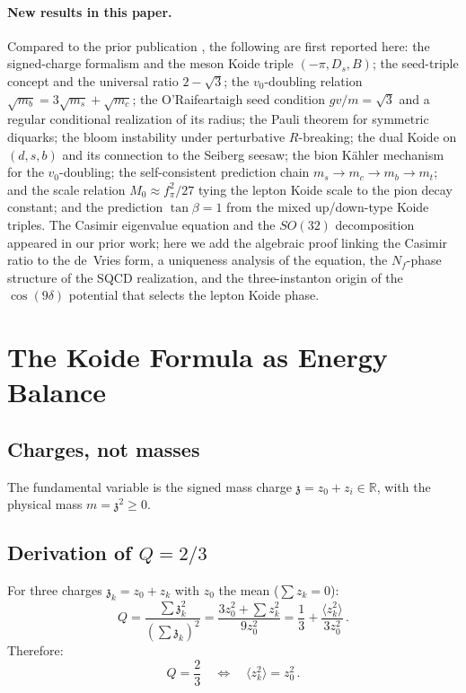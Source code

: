 \documentclass[12pt,a4paper]{article}
\newcommand{\fpi}{f_\pi}
\newcommand{\zch}{\mathfrak{z}}
\begin{document}
\paragraph{New results in this paper.}
Compared to the prior publication \cite{Rivero2005}, the
following are first reported here: the signed-charge formalism
and the meson Koide triple $(-\pi, D_s, B)$; the seed-triple
concept and the universal ratio $2 - \sqrt{3}$; the
$v_0$-doubling relation $\sqrt{m_b} = 3\sqrt{m_s} + \sqrt{m_c}$;
the O'Raifeartaigh seed condition $gv/m = \sqrt{3}$ and a
regular conditional realization of its radius; the Pauli theorem
for symmetric diquarks; the bloom instability under perturbative
$R$-breaking; the dual Koide on $(d,s,b)$ and its connection to
the Seiberg seesaw; the bion K\"ahler mechanism for the
$v_0$-doubling; the self-consistent prediction chain
$m_s \to m_c \to m_b \to m_t$; and the scale relation
$M_0 \approx \fpi^2/27$ tying the lepton Koide scale
to the pion decay constant; and the prediction $\tan\beta = 1$
from the mixed up/down-type Koide triples.
The Casimir eigenvalue equation and the $SO(32)$
decomposition appeared in our prior work; here we add the
algebraic proof linking the Casimir ratio to the de~Vries form,
a uniqueness analysis of the equation, the
$N_f$-phase structure of the SQCD realization, and the
three-instanton origin of the $\cos(9\delta)$ potential
that selects the lepton Koide phase.

\section{The Koide Formula as Energy Balance}
\label{sec:koide_algebra}

\subsection{Charges, not masses}

The fundamental variable is the signed mass charge $\zch = z_0 + z_i 
\in \mathbb{R}$, with the physical mass $m = \zch^2 \geq 0$.

\subsection{Derivation of $Q = 2/3$}

For three charges $\zch_k = z_0 + z_k$ with $z_0$ the mean 
($\sum z_k = 0$):
\begin{equation}
Q = \frac{\sum \zch_k^2}{(\sum \zch_k)^2} 
= \frac{3z_0^2 + \sum z_k^2}{9z_0^2}
= \frac{1}{3} + \frac{\langle z_k^2\rangle}{3z_0^2}\,.
\end{equation}
Therefore:
\begin{equation}
\boxed{Q = \frac{2}{3} \quad\Longleftrightarrow\quad 
\langle z_k^2\rangle = z_0^2\,.}
\end{equation}
\end{document}

